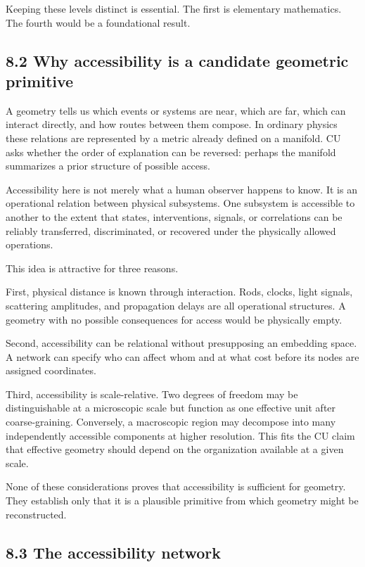 \documentclass[
  11pt,
]{article}
\begin{document}
Keeping these levels distinct is essential. The first is elementary
mathematics. The fourth would be a foundational result.

\subsection{8.2 Why accessibility is a candidate geometric
primitive}\label{why-accessibility-is-a-candidate-geometric-primitive}

A geometry tells us which events or systems are near, which are far,
which can interact directly, and how routes between them compose. In
ordinary physics these relations are represented by a metric already
defined on a manifold. CU asks whether the order of explanation can be
reversed: perhaps the manifold summarizes a prior structure of possible
access.

Accessibility here is not merely what a human observer happens to know.
It is an operational relation between physical subsystems. One subsystem
is accessible to another to the extent that states, interventions,
signals, or correlations can be reliably transferred, discriminated, or
recovered under the physically allowed operations.

This idea is attractive for three reasons.

First, physical distance is known through interaction. Rods, clocks,
light signals, scattering amplitudes, and propagation delays are all
operational structures. A geometry with no possible consequences for
access would be physically empty.

Second, accessibility can be relational without presupposing an
embedding space. A network can specify who can affect whom and at what
cost before its nodes are assigned coordinates.

Third, accessibility is scale-relative. Two degrees of freedom may be
distinguishable at a microscopic scale but function as one effective
unit after coarse-graining. Conversely, a macroscopic region may
decompose into many independently accessible components at higher
resolution. This fits the CU claim that effective geometry should depend
on the organization available at a given scale.

None of these considerations proves that accessibility is sufficient for
geometry. They establish only that it is a plausible primitive from
which geometry might be reconstructed.

\subsection{8.3 The accessibility
network}\label{the-accessibility-network}
\end{document}
